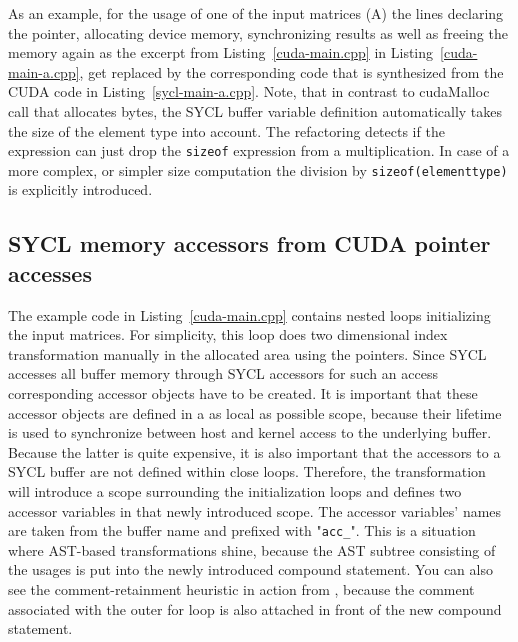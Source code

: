 \documentclass[sigconf]{acmart}
\newcommand{\inputcode}[2]{}
\newcommand{\inputsycl}[2]{}
\newcommand{\tcode}[1]{\texttt{#1}}
\begin{document}
As an example, for the usage of one of the input matrices (A) the lines declaring the pointer, allocating device memory, synchronizing results as well as freeing the memory again as the excerpt from Listing~\ref{cuda-main.cpp} in Listing~\ref{cuda-main-a.cpp}, get replaced by the corresponding code that is synthesized from the CUDA code in Listing~\ref{sycl-main-a.cpp}. Note, that in contrast to cudaMalloc call that allocates bytes, the SYCL buffer variable definition automatically takes the size of the element type into account. The refactoring detects if the expression can just drop the \tcode{sizeof} expression from a multiplication. In case of a more complex, or simpler size computation the division by \tcode{sizeof(elementtype)} is explicitly introduced.

\inputcode{cuda-main-a.cpp}{Setting up and cleaning up CUDA input data.}
\inputsycl{sycl-main-a.cpp}{SYCL buffer declaration replaces all lines in Listing~\ref{cuda-main-a.cpp}}

\subsection{SYCL memory accessors from CUDA pointer accesses}
\label{SYCL:accessors}
The example code in Listing~\ref{cuda-main.cpp} contains nested loops initializing the input matrices. For simplicity, this loop does two dimensional index transformation manually in the allocated area using the pointers. 
Since SYCL accesses all buffer memory through SYCL accessors for such an access corresponding accessor objects have to be created. 
It is important that these accessor objects are defined in a as local as possible scope, because their lifetime is used to synchronize between host and kernel access to the underlying buffer. 
Because the latter is quite expensive, it is also important that the accessors to a SYCL buffer are not defined within close loops. 
Therefore, the transformation will introduce a scope surrounding the initialization loops and defines two accessor variables in that newly introduced scope. The accessor variables' names are taken from the buffer name and prefixed with "\tcode{acc_}". 
This is a situation where AST-based transformations shine, because the AST subtree consisting of the usages is put into the newly introduced compound statement. 
You can also see the comment-retainment heuristic in action from \cite{Sommerlad2008}, because the comment associated with the outer for loop is also attached in front of the new compound statement.
\end{document}
